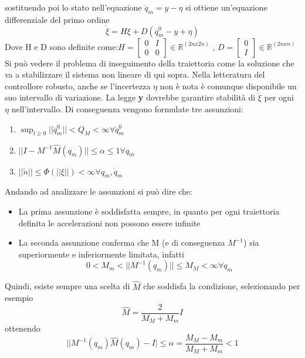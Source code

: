 sostituendo poi lo stato nell'equazione $\ddot{q}_m = y-\eta$ si ottiene un'equazione differenziale del primo ordine
\begin{equation}
\dot{\xi} = H\xi + D(\ddot{q}_m^0 - y + \eta)
\end{equation}
Dove H e D sono definite come:$H = \begin{bmatrix}
0 & I \\ 0 & 0
\end{bmatrix} \in \mathbb{R}^{(2nx2n)}$ , $D = \begin{bmatrix}
0 \\ I
\end{bmatrix} \in \mathbb{R}^{(2nxn)}$
\\Si può vedere il problema di inseguimento della traiettoria come la soluzione che va a stabilizzare il sistema non lineare di qui sopra. Nella letteratura del controllore robusto, anche se l'incertezza $\eta$ non è nota è comunque disponibile un suo intervallo di variazione. La legge \textbf{y} dovrebbe garantire stabilità di $\dot{\xi}$ per ogni $\eta$ nell'intervallo. Di conseguenza vengono formulate tre assunzioni:
\begin{enumerate}
\item $\sup_{t\ge 0} ||\ddot{q}^0_m || < Q_M < \infty \forall \ddot{q}_m^0$
\item $||I-M^{-1}\hat{M}(q_m)|| \le \alpha \le 1 \forall q_m$
\item $||\tilde{n}|| \le \Phi(||\xi||) < \infty \forall q_m, \dot{q}_m$
\end{enumerate}
Andando ad analizzare le assunzioni si può dire che:
\begin{itemize}
\item La prima assunzione è soddisfatta sempre, in quanto per ogni traiettoria definita le accelerazioni non possono essere infinite
\item La seconda assunzione conferma che M  (e di conseguenza $M^{-1}$) sia superiormente e inferiormente limitata, infatti 
\begin{equation}
0 < M_m < ||M^{-1}(q_m)|| \le M_M < \infty \forall q_m
\end{equation}
\end{itemize}
Quindi, esiste sempre una scelta di $\hat{M}$ che soddisfa la condizione, selezionando per esempio
\begin{equation*}
\hat{M} = \frac{2}{M_M+M_m}I
\end{equation*} 
ottenendo
\begin{equation}
||M^{-1}(q_m)\hat{M}(q_m)-I|\le \alpha = \frac{M_M-M_m}{M_M+M_m} <1
\end{equation}
